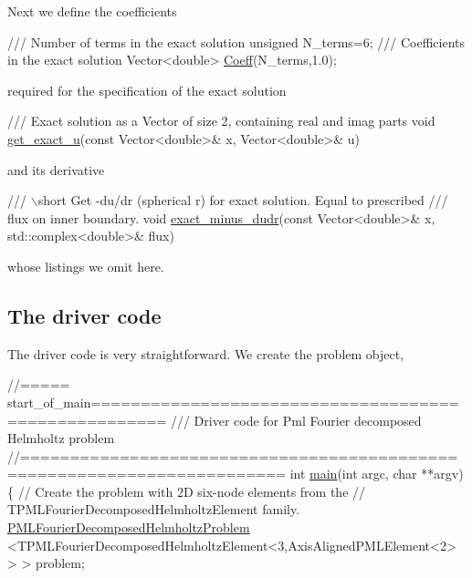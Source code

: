 Next we define the coefficients

 
\begin{DoxyCodeInclude}
 \textcolor{comment}{/// Number of terms in the exact solution}
 \textcolor{keywordtype}{unsigned} N\_terms=6;
\textcolor{comment}{}
\textcolor{comment}{ /// Coefficients in the exact solution}
\textcolor{comment}{} Vector<double> \hyperlink{namespaceProblemParameters_a20cc9776e745842f6126f4cd17659d19}{Coeff}(N\_terms,1.0);

\end{DoxyCodeInclude}


required for the specification of the exact solution

 
\begin{DoxyCodeInclude}
 \textcolor{comment}{/// Exact solution as a Vector of size 2, containing real and imag parts}
 \textcolor{keywordtype}{void} \hyperlink{namespaceProblemParameters_af750b29069b29bd38b5220ecf534e7f7}{get\_exact\_u}(\textcolor{keyword}{const} Vector<double>& x, Vector<double>& u)

\end{DoxyCodeInclude}


and its derivative

 
\begin{DoxyCodeInclude}
 \textcolor{comment}{/// \(\backslash\)short Get -du/dr (spherical r) for exact solution. Equal to prescribed}
\textcolor{comment}{ /// flux on inner boundary.}
\textcolor{comment}{} \textcolor{keywordtype}{void} \hyperlink{namespaceProblemParameters_aa544d1f3e384d3283f7113512931ea8f}{exact\_minus\_dudr}(\textcolor{keyword}{const} Vector<double>& x, std::complex<double>& flux)

\end{DoxyCodeInclude}


whose listings we omit here.



\hypertarget{index_drv_cde}{}\subsection{The driver code}\label{index_drv_cde}
The driver code is very straightforward. We create the problem object,

 
\begin{DoxyCodeInclude}
\textcolor{comment}{//===== start\_of\_main=====================================================}
\textcolor{comment}{/// Driver code for Pml Fourier decomposed Helmholtz problem}
\textcolor{comment}{}\textcolor{comment}{//========================================================================}
\textcolor{keywordtype}{int} \hyperlink{oscillating__sphere_8cc_a3c04138a5bfe5d72780bb7e82a18e627}{main}(\textcolor{keywordtype}{int} argc, \textcolor{keywordtype}{char} **argv)
\{
 \textcolor{comment}{// Create the problem with 2D six-node elements from the}
 \textcolor{comment}{// TPMLFourierDecomposedHelmholtzElement family.}
 \hyperlink{classPMLFourierDecomposedHelmholtzProblem}{PMLFourierDecomposedHelmholtzProblem}
  <TPMLFourierDecomposedHelmholtzElement<3,AxisAlignedPMLElement<2> > >
  problem;

\end{DoxyCodeInclude}


